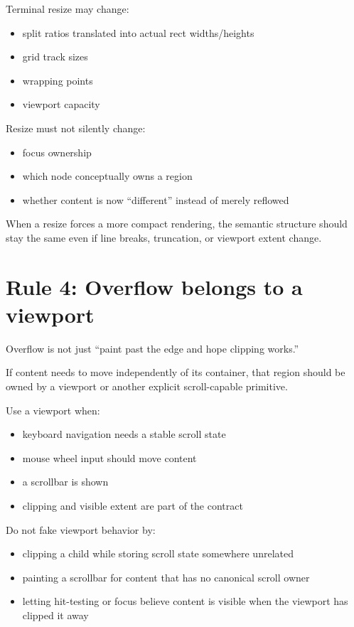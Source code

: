 Terminal resize may change:

\begin{itemize}
\tightlist
\item
  split ratios translated into actual rect widths/heights
\item
  grid track sizes
\item
  wrapping points
\item
  viewport capacity
\end{itemize}

Resize must not silently change:

\begin{itemize}
\tightlist
\item
  focus ownership
\item
  which node conceptually owns a region
\item
  whether content is now ``different'' instead of merely reflowed
\end{itemize}

When a resize forces a more compact rendering, the semantic structure should stay the same even if line breaks, truncation, or viewport extent change.

\section{Rule 4: Overflow belongs to a viewport}\label{record-048-rule-4-overflow-belongs-to-a-viewport}

Overflow is not just ``paint past the edge and hope clipping works.''

If content needs to move independently of its container, that region should be owned by a viewport or another explicit scroll-capable primitive.

Use a viewport when:

\begin{itemize}
\tightlist
\item
  keyboard navigation needs a stable scroll state
\item
  mouse wheel input should move content
\item
  a scrollbar is shown
\item
  clipping and visible extent are part of the contract
\end{itemize}

Do not fake viewport behavior by:

\begin{itemize}
\tightlist
\item
  clipping a child while storing scroll state somewhere unrelated
\item
  painting a scrollbar for content that has no canonical scroll owner
\item
  letting hit-testing or focus believe content is visible when the viewport has clipped it away
\end{itemize}

